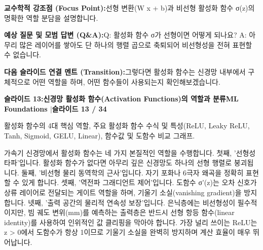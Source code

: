 \documentclass[11pt,a4paper]{article}
\begin{document}
\vspace{0.2em}
\begin{tcolorbox}[colback=lightbg,colframe=bordergray,left=6pt,right=6pt,top=3pt,bottom=3pt,boxrule=0.6pt,arc=2.5pt]
\small
\noindent\textbf{\color{navy}교수학적 강조점 (Focus Point):}\enspace 선형 변환(W x + b)과 비선형 활성화 함수 σ(z)의 명확한 역할 분담을 설명합니다.\par\vspace{0.3em}
\noindent\textbf{\color{successgreen}예상 질문 및 모범 답변 (Q\&A):}\enspace Q: 활성화 함수 σ가 선형이면 어떻게 되나요? A: 아무리 많은 레이어를 쌓아도 단 하나의 행렬 곱으로 축퇴되어 비선형성을 전혀 표현할 수 없습니다.\par\vspace{0.3em}
\noindent\textbf{\color{accent}다음 슬라이드 연결 멘트 (Transition):}\enspace 그렇다면 활성화 함수는 신경망 내부에서 구체적으로 어떤 역할을 하며, 어떤 함수들이 사용되는지 확인해보겠습니다.
\end{tcolorbox}
\clearpage
\hypertarget{slide.13}{}
{}
\noindent\begin{tcolorbox}[colback=navy,colframe=navy,left=6pt,right=6pt,top=3pt,bottom=3pt,boxrule=0pt,arc=2pt]
{\large\bfseries\color{white}슬라이드 13:\enspace 신경망 활성화 함수(Activation Functions)의 역할과 분류}\hfill{\footnotesize\bfseries\color{white!85!lightbg}ML Foundations \enspace$|$\enspace 슬라이드 13 / 34}
\end{tcolorbox}
\vspace{0.2em}
\begin{tcolorbox}[colback=lightbg,colframe=bordergray,title={\footnotesize\bfseries\color{darkgray}슬라이드 시각 구성 요약},fontupper=\small,left=6pt,right=6pt,top=2.5pt,bottom=2.5pt,boxrule=0.6pt,arc=2.5pt]
활성화 함수의 4대 핵심 역할, 주요 활성화 함수 수식 및 특성(ReLU, Leaky ReLU, Tanh, Sigmoid, GELU, Linear), 함수값 및 도함수 비교 그래프.
\end{tcolorbox}
\vspace{0.2em}
\begin{tcolorbox}[colback=white,colframe=primaryblue,title={\footnotesize\bfseries\color{white}발표자 구두 대본 (Spoken Script)},fontupper=\small,left=6pt,right=6pt,top=3pt,bottom=3pt,boxrule=0.8pt,arc=2.5pt]
가속기 신경망에서 활성화 함수는 네 가지 본질적인 역할을 수행합니다. 첫째, '선형성 타파'입니다. 활성화 함수가 없다면 아무리 깊은 신경망도 하나의 선형 행렬로 붕괴됩니다. 둘째, '비선형 물리 동역학의 근사'입니다. 자기 포화나 6극자 왜곡을 정확히 표현할 수 있게 합니다. 셋째, '역전파 그래디언트 제어'입니다. 도함수 σ'(z)는 오차 신호가 상류 레이어로 전달되는 게이트 역할을 하며, 기울기 소실(vanishing gradient)을 방지합니다. 넷째, '출력 공간의 물리적 연속성 보장'입니다. 은닉층에는 비선형성이 필수적이지만, 빔 궤도 변위(mm)를 예측하는 출력층은 반드시 선형 항등 함수(linear identity)를 사용하여 인위적인 값 클리핑을 막아야 합니다. 가장 널리 쓰이는 ReLU는 z > 0에서 도함수가 항상 1이므로 기울기 소실을 완벽히 방지하며 계산 효율이 매우 뛰어납니다.
\end{tcolorbox}
\end{document}
